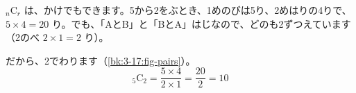\noindent\begin{minipage}[t]{0.46\linewidth}\vspace{0pt}
${}_n\mathrm{C}_r$ は、かけでもできます。5から2をぶとき、1めのびは5り、2めはりの4りで、$5\times4=20$ り。でも、「AとB」と「BとA」はじなので、どのも2ずつえています（2のべ $2\times1=2$ り）。
\end{minipage}\hfill
\begin{minipage}[t]{67mm}\vspace{0pt}\end{minipage}
\par\vspace{3pt}
だから、2でわります（\ref{bk:3-17:fig-pairs}）。
\[ {}_5\mathrm{C}_2=\frac{5\times4}{2\times1}=\frac{20}{2}=10 \]
